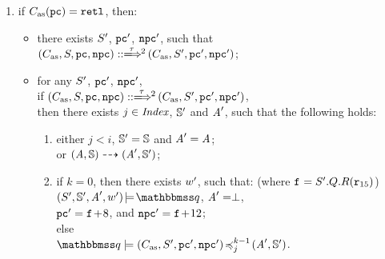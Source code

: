 \begin{definition}
\begin{enumerate}[1.]
        \item if {\em $C_{\text{as}}(\texttt{pc}) = \texttt{retl}{}$}, then:
            \begin{itemize}
                \item there exists $S'$, {\em $\texttt{pc}'$}, {\em $\texttt{npc}'$},
                such that \\
                   {\em $\LGlobMultiTrans{(\asmimp, \state, \pc, \npc)}
                            {\empmsg\,}{2}{(\asmimp, \state', \pc', \npc')}$};
                \item for any $S'$, {\em $\texttt{pc}'$}, {\em $\texttt{npc}'$}, \\
                    if {\em $\LGlobMultiTrans{(\asmimp, \state, \pc, \npc)}
                            {\empmsg\,}{2}{(\asmimp, \state', \pc', \npc')}$}, \\
                    then there exists $j \in \textit{Index}$, $\mathbb{S}'$ and
                    $\textit{A}'$, such that the following holds:
                    \begin{enumerate}
                        \item either $j < i$, $\mathbb{S}' = \mathbb{S}$
                            and $\textit{A}' = \textit{A}$; \\
                            or ${(\textit{A}, \mathbb{S})} \dashrightarrow {(\textit{A}', \mathbb{S}')}$;
                        \item if $k = 0$, then there exists
                        	$w'$, such that:
                        	(where {\em $\texttt{f}_{} = S'.Q.R(\texttt{r}_{15})$}) \\
                            \hspace*{2em}
                            $\asrtmodel{(\state', \hpstate', \primcom', \word')}
                                {\relastQ}$,
                            $\textit{A}' = \perp$, \\
                            \hspace*{2em}
                            {\em $\texttt{pc}' = \texttt{f}_{}\!+\!8$}, and
                            {\em $\texttt{npc}' = \texttt{f}_{}\!+\!12$}; \\
                            else \\
                            \hspace*{2em}
                            {\em $\simFunctionSt{\relastQ}{(\asmimp, \state', \pc', \npc')}
                                    {j}{k-1}{(\primcom', \hpstate')}$}.
                    \end{enumerate}
            \end{itemize}
    \end{enumerate}
\end{definition}

